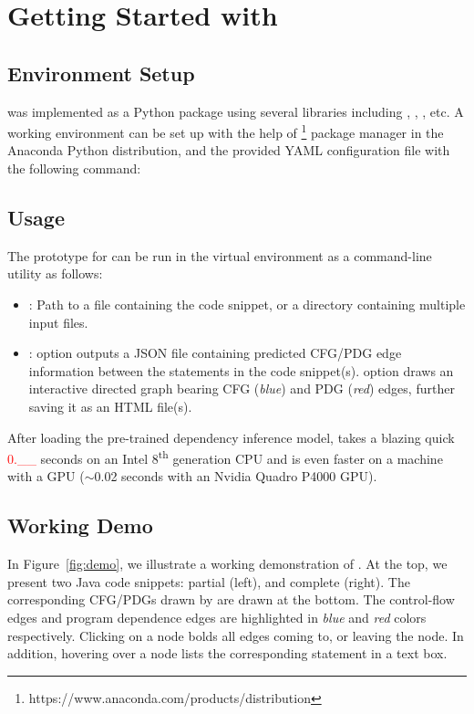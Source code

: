 \section{Getting Started with \tool}
\subsection{Environment Setup}
\tool was implemented as a Python package using 
several libraries including , , ,
etc. A working environment can be set up with the help of 
\footnote{https://www.anaconda.com/products/distribution} package manager in the Anaconda Python distribution, 
and the provided YAML configuration file with the following 
command: 

\subsection{Usage}
The prototype for \tool can be run in the virtual environment as a command-line utility as follows:

\noindent {}
\begin{itemize}
    \item {}: Path to a  file containing the code snippet, or a directory containing multiple input  files. 
    \item {}:  option outputs a JSON file containing predicted CFG/PDG edge information between the statements in the code snippet(s).  option draws an interactive directed graph bearing CFG (\textit{blue}) and PDG (\textit{red}) edges, further saving it as an HTML file(s). 
\end{itemize}

After loading the pre-trained dependency inference model, \tool takes a blazing quick \textcolor{red}{0.\_\_} seconds on an Intel 8\textsuperscript{th} generation CPU and is even faster on a machine with a GPU ($\sim$0.02 seconds with an Nvidia Quadro P4000 GPU).

\subsection{Working Demo}


In Figure~\ref{fig:demo}, we illustrate a working demonstration of \tool. At the top, we present two Java code snippets: partial (left), and complete (right). The corresponding CFG/PDGs drawn by \tool are drawn at the bottom. The control-flow edges and program dependence edges are highlighted in \textit{blue} and \textit{red} colors respectively. Clicking on a node bolds all edges coming to, or leaving the node. In addition, hovering over a node lists the corresponding statement in a text box.

